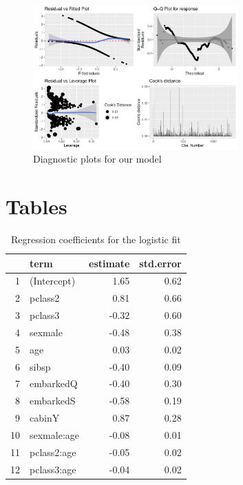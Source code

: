 \documentclass[]{extarticle}
\begin{document}
\begin{figure}[H]
	\centering
	\includegraphics[width=0.7\textwidth]{modeldiag}
	\caption{Diagnostic plots for our model}
	\label{fig:modeldiag}
\end{figure}

\section{Tables}
\begin{table}[H]
	\centering
	\begin{tabular}{rlrr}
		\hline
		& term & estimate & std.error \\ 
		\hline
		1 & (Intercept) & 1.65 & 0.62 \\ 
		2 & pclass2 & 0.81 & 0.66 \\ 
		3 & pclass3 & -0.32 & 0.60 \\ 
		4 & sexmale & -0.48 & 0.38 \\ 
		5 & age & 0.03 & 0.02 \\ 
		6 & sibsp & -0.40 & 0.09 \\ 
		7 & embarkedQ & -0.40 & 0.30 \\ 
		8 & embarkedS & -0.58 & 0.19 \\ 
		9 & cabinY & 0.87 & 0.28 \\ 
		10 & sexmale:age & -0.08 & 0.01 \\ 
		11 & pclass2:age & -0.05 & 0.02 \\ 
		12 & pclass3:age & -0.04 & 0.02 \\ 
		\hline
	\end{tabular}
\caption{Regression coefficients for the logistic fit}
\label{tab:regco}
\end{table}
\end{document}
